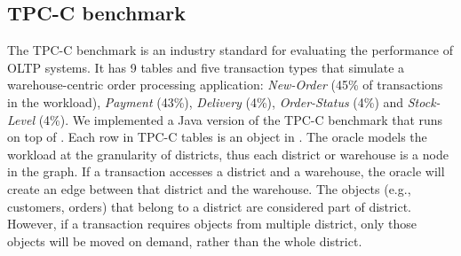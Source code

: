 
\subsection{TPC-C benchmark}
\label{sec:imp:tpcc}


The TPC-C benchmark is an industry standard for evaluating the performance of OLTP systems.
It has 9 tables and five transaction types that simulate a warehouse-centric 
order processing application: \emph{New-Order} (45\% of transactions in the workload), \emph{Payment} (43\%), \emph{Delivery}
(4\%), \emph{Order-Status} (4\%) and \emph{Stock-Level} (4\%).
We implemented a Java version of the TPC-C benchmark that runs on top of \dynastar. 
Each row in TPC-C tables is an object in \dynastar. The oracle models the workload at the granularity of districts,
thus each district or warehouse is a node in the graph. If a transaction accesses a district 
and a warehouse, the oracle will create an edge between that district and the warehouse.
The objects (e.g., customers, orders) that belong to a district 
are considered part of district. However, if a transaction requires
objects from multiple district, only those objects will be moved on demand, rather than
the whole district.

